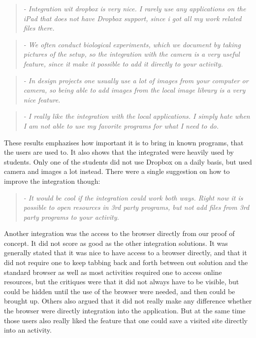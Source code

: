 	\begin{quotation}
		\emph{
			- Integration wit dropbox is very nice. I rarely use any applications on the iPad that does not have Dropbox support, since i got all my work related files there.
		}
	\end{quotation}

	\begin{quotation}
		\emph{
			- We often conduct biological experiments, which we document by taking pictures of the setup, so the integration with the camera is a very useful feature, since it make it possible to add it directly to your activity.
		}
	\end{quotation}
	
	\begin{quotation}
		\emph{
			- In design projects one usually use a lot of images from your computer or camera, so being able to add images from the local image library is a very nice feature.
		}
	\end{quotation}
	
	\begin{quotation}
		\emph{
			- I really like the integration with the local applications. I simply hate when I am not able to use my favorite programs for what I need to do.
		}
	\end{quotation}
	
These results emphazises how important it is to bring in known programs, that the users are used to. It also shows that the integrated were heavily used by students. Only one of the students did not use Dropbox on a daily basis, but used camera and images a lot instead. There were a single suggestion on how to improve the integration though:

	\begin{quotation}
		\emph{
			- It would be cool if the integration could work both ways. Right now it is possible to open resources in 3rd party programs, but not add files from 3rd party programs to your activity.
		}
	\end{quotation}
	
Another integration was the access to the browser directly from our proof of concept. It did not score as good as the other integration solutions. It was generally stated that it was nice to have access to a browser directly, and that it did not require one to keep tabbing back and forth between out solution and the standard browser as well as most activities required one to access online resources, but the critiques were that it did not always have to be visible, but could be hidden until the use of the browser were needed, and then could be brought up. Others also argued that it did not really make any difference whether the browser were directly integration into the application. But at the same time those users also really liked the feature that one could save a visited site directly into an activity.

